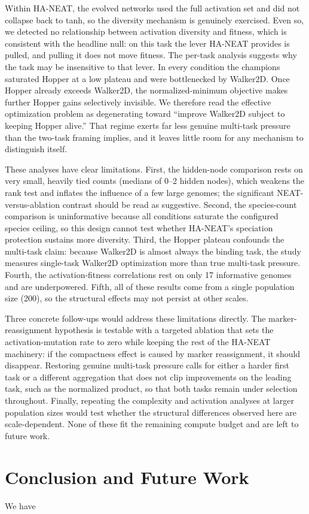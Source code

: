 \documentclass[12pt]{article}
\begin{document}
Within HA-NEAT, the evolved networks used the full activation set and did not collapse back to
tanh, so the diversity mechanism is genuinely exercised. Even so, we detected no relationship
between activation diversity and fitness, which is consistent with the headline null: on this task
the lever HA-NEAT provides is pulled, and pulling it does not move fitness. The per-task analysis
suggests why the task may be insensitive to that lever. In every condition the champions saturated
Hopper at a low plateau and were bottlenecked by Walker2D. Once Hopper already exceeds Walker2D,
the normalized-minimum objective makes further Hopper gains selectively invisible. We therefore
read the effective optimization problem as degenerating toward ``improve Walker2D subject to keeping
Hopper alive.'' That regime exerts far less genuine multi-task pressure than the two-task framing
implies, and it leaves little room for any mechanism to distinguish itself.

These analyses have clear limitations. First, the hidden-node comparison rests on very small,
heavily tied counts (medians of 0--2 hidden nodes), which weakens the rank test and inflates the
influence of a few large genomes; the significant NEAT-versus-ablation contrast should be read as
suggestive. Second, the species-count comparison is uninformative because all conditions saturate
the configured species ceiling, so this design cannot test whether HA-NEAT's speciation protection
sustains more diversity. Third, the Hopper plateau confounds the multi-task claim: because Walker2D
is almost always the binding task, the study measures single-task Walker2D optimization more than
true multi-task pressure. Fourth, the activation-fitness correlations rest on only 17 informative
genomes and are underpowered. Fifth, all of these results come from a single population size (200),
so the structural effects may not persist at other scales.

Three concrete follow-ups would address these limitations directly. The marker-reassignment
hypothesis is testable with a targeted ablation that sets the activation-mutation rate to zero
while keeping the rest of the HA-NEAT machinery: if the compactness effect is caused by marker
reassignment, it should disappear. Restoring genuine multi-task pressure calls for either a harder
first task or a different aggregation that does not clip improvements on the leading task, such as
the normalized product, so that both tasks remain under selection throughout. Finally, repeating
the complexity and activation analyses at larger population sizes would test whether the structural
differences observed here are scale-dependent. None of these fit the remaining compute budget and
are left to future work.




\section{Conclusion and Future Work}
We have 

\clearpage
\printbibliography
\end{document}
